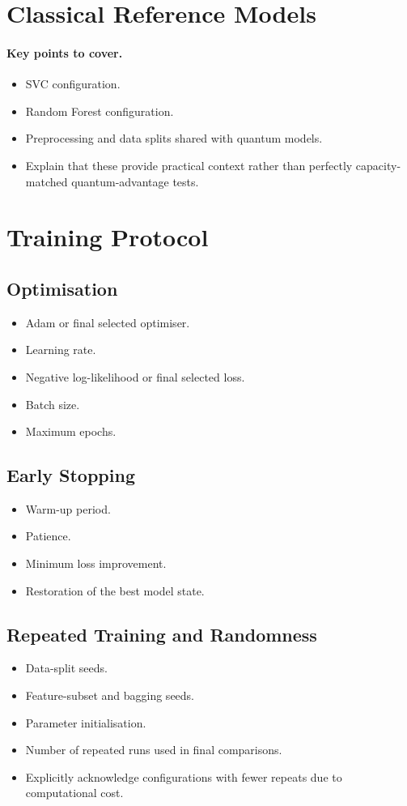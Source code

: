 \documentclass[]{UCD_CS_MSc_AAI_Report}
\newcommand{\sectionbrief}{\paragraph{Key points to cover.}}
\begin{document}
\section{Classical Reference Models}
\label{sec:method-classical-baselines}

\sectionbrief
\begin{itemize}
    \item SVC configuration.
    \item Random Forest configuration.
    \item Preprocessing and data splits shared with quantum models.
    \item Explain that these provide practical context rather than perfectly capacity-matched quantum-advantage tests.
\end{itemize}

\section{Training Protocol}
\label{sec:method-training}

\subsection{Optimisation}
\begin{itemize}
    \item Adam or final selected optimiser.
    \item Learning rate.
    \item Negative log-likelihood or final selected loss.
    \item Batch size.
    \item Maximum epochs.
\end{itemize}

\subsection{Early Stopping}
\begin{itemize}
    \item Warm-up period.
    \item Patience.
    \item Minimum loss improvement.
    \item Restoration of the best model state.
\end{itemize}

\subsection{Repeated Training and Randomness}
\begin{itemize}
    \item Data-split seeds.
    \item Feature-subset and bagging seeds.
    \item Parameter initialisation.
    \item Number of repeated runs used in final comparisons.
    \item Explicitly acknowledge configurations with fewer repeats due to computational cost.
\end{itemize}
\end{document}
